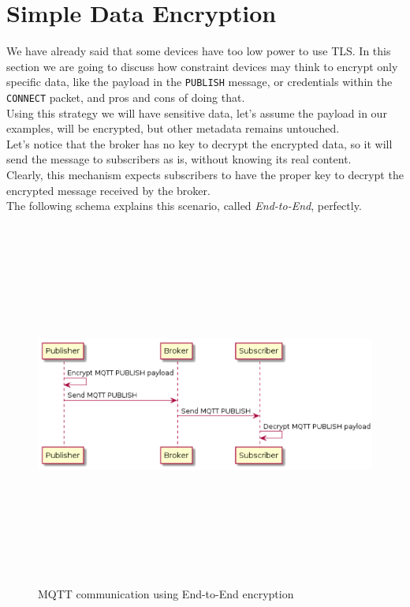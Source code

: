 \documentclass[12pt]{report}
\begin{document}
{\section{Simple Data Encryption}
\bigskip
We have already said that some devices have too low power to use TLS.
In this section we are going to discuss how constraint devices may think to encrypt only specific data, like the payload in the \texttt{PUBLISH} message, or credentials within the \texttt{CONNECT} packet, and pros and cons of doing that.\\
Using this strategy we will have sensitive data, let's assume the payload in our examples, will be encrypted, but other metadata remains untouched.\\
Let's notice that the broker has no key to decrypt the encrypted data, so it will send the message to subscribers as is, without knowing its real content.\\
Clearly, this mechanism expects subscribers to have the proper key to decrypt the encrypted message received by the broker.\\
The following schema explains this scenario, called \emph{End-to-End}, perfectly.

\begin{figure}[H]
\includegraphics[width=12cm,height=12cm,keepaspectratio]{end_to_end}
\centering
\caption{MQTT communication using End-to-End encryption}
\end{figure}

}
\end{document}
